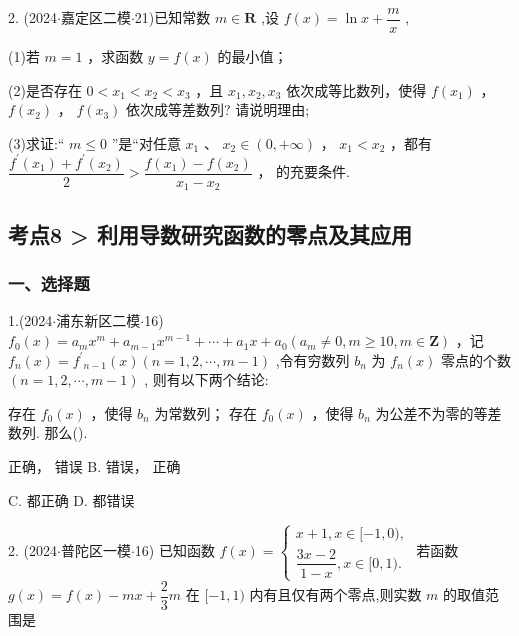 2. (2024$\cdot$嘉定区二模$\cdot$21)已知常数 $m \in  \mathbf{R}$ ,设 $f\left( x\right)  = \ln x + \dfrac{m}{x}$ ,

(1)若 $m = 1$ ，求函数 $y = f\left( x\right)$ 的最小值；

(2)是否存在 $0 < {x}_{1} < {x}_{2} < {x}_{3}$ ，且 ${x}_{1},{x}_{2},{x}_{3}$ 依次成等比数列，使得 $f\left( {x}_{1}\right)$ ， $f\left( {x}_{2}\right)$ ， $f\left( {x}_{3}\right)$ 依次成等差数列? 请说明理由;

(3)求证:“ $m \leq  0$ ”是“对任意 ${x}_{1}$ 、 ${x}_{2} \in  \left( {0, + \infty }\right)$ ， ${x}_{1} < {x}_{2}$ ，都有 $\dfrac{{f}^{\prime }\left( {x}_{1}\right)  + {f}^{\prime }\left( {x}_{2}\right) }{2} > \dfrac{f\left( {x}_{1}\right)  - f\left( {x}_{2}\right) }{{x}_{1} - {x}_{2}}$ ， 的充要条件.

\subsection*{考点8 > 利用导数研究函数的零点及其应用}

\subsubsection*{一、选择题}

1.(2024$\cdot$浦东新区二模$\cdot$16) ${f}_{0}\left( x\right)  = {a}_{m}{x}^{m} + {a}_{m - 1}{x}^{m - 1} + \cdots  + {a}_{1}x + {a}_{0}\left( {{a}_{m} \neq  0,m \geq  {10},m \in  \mathbf{Z}}\right)$ ，记 ${f}_{n}\left( x\right)  = {f}^{\prime }{}_{n - 1}\left( x\right) \left( {n = 1,2,\cdots ,m - 1}\right)$ ,令有穷数列 ${b}_{n}$ 为 ${f}_{n}\left( x\right)$ 零点的个数 $\left( {n = 1,2,\cdots ,m - 1}\right)$ , 则有以下两个结论:

   存在 ${f}_{0}\left( x\right)$ ，使得 ${b}_{n}$ 为常数列；   存在 ${f}_{0}\left( x\right)$ ，使得 ${b}_{n}$ 为公差不为零的等差数列. 那么().

\xx{}{}{}{}  正确，  错误 B.   错误，  正确

C.     都正确 D.     都错误

2. (2024$\cdot$普陀区一模$\cdot$16) 已知函数 $f\left( x\right)  = \left\{  \begin{array}{l} x + 1,x \in  \lbrack  - 1,0), \\  \dfrac{{3x} - 2}{1 - x},x \in  \lbrack 0,1). \end{array}\right.$ 若函数 $g\left( x\right)  = f\left( x\right)  - {mx} + \dfrac{2}{3}m$ 在 $\lbrack  - 1,1)$ 内有且仅有两个零点,则实数 $m$ 的取值范围是 \dotfill{(\kh{})}

